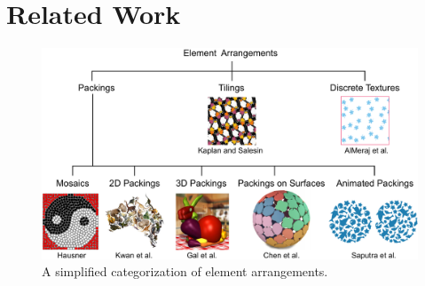 
\chapter{Related Work}
\label{chapter_related_work}

\begin{figure}[t]
\centering
\includegraphics[width=1.0\textwidth]{figures/related/taxonomy.pdf} 
\caption[A categorization of element arrangements]
{\label{fig_taxonomy} 
\nnewtext
{
A simplified categorization of element arrangements.
}
}
\end{figure}


